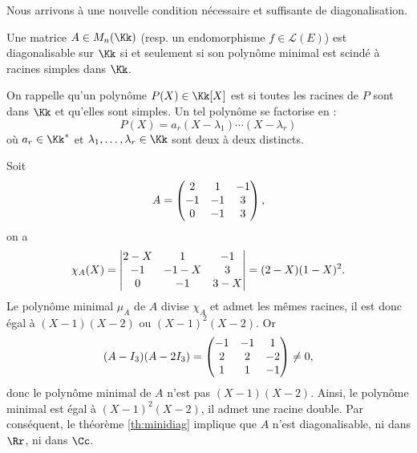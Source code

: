 \documentclass[12pt, class=report,crop=false]{standalone}
\begin{document}
Nous arrivons à une nouvelle condition nécessaire et suffisante de diagonalisation.


\begin{theoreme}
\label{th:minidiag}
Une matrice $A \in M_n(\Kk)$ (resp. un endomorphisme $f \in\mathcal{L}(E)$) est diagonalisable sur $\Kk$ si et seulement si son polynôme minimal est scindé à racines simples dans $\Kk$.
\end{theoreme}

On rappelle qu'un polynôme $P(X) \in \Kk[X]$ est  
si toutes les racines de $P$ sont dans $\Kk$ et qu'elles sont simples. Un tel polynôme se factorise en :
\[P(X) = a_r (X-\lambda_1)\cdots(X-\lambda_r)\]
où $a_r \in \Kk^*$ et $\lambda_1,\ldots,\lambda_r \in \Kk$ sont deux à deux distincts. 


\begin{exemple}
Soit 
$$A=\begin{pmatrix}2&1&-1\cr -1&-1&3\cr 0&-1&3\end{pmatrix},$$
on a 
$$\chi_A(X)=\begin{vmatrix}2-X&1&-1\cr -1&-1-X&3\cr 0&-1&3-X\end{vmatrix}=(2-X)(1-X)^2.$$
Le polynôme minimal $\mu_A$ de $A$ divise $\chi_A$ et admet les mêmes racines,
il est donc égal à $(X-1)(X-2)$ ou $(X-1)^2(X-2)$. Or
$$(A-I_3)(A-2I_3)=\begin{pmatrix}-1&-1&1\cr 2&2&-2\cr 1&1&-1\end{pmatrix}\neq 0,$$
donc le polynôme minimal de $A$ n'est pas $(X-1)(X-2)$.
Ainsi, le polynôme minimal est égal à $(X-1)^2(X-2)$, 
il admet une racine double. Par conséquent, le théorème \ref{th:minidiag} implique que $A$ n'est diagonalisable, 
ni dans $\Rr$, ni dans $\Cc$.  
\end{exemple}
\end{document}
